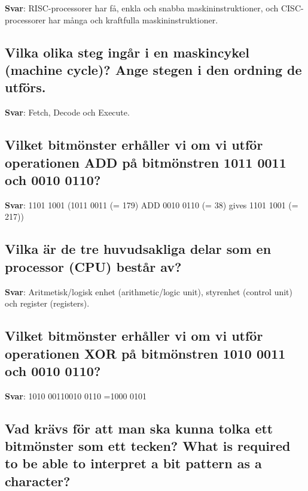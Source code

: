 \documentclass[a4paper,11pt,oneside]{article}
\begin{document}
\begin{sloppypar}
\label{q:97:sa:sv:True}

\textbf{Svar}: RISC-processorer har f\r{a}, enkla och snabba maskininstruktioner, och CISC-processorer har m\r{a}nga och kraftfulla maskininstruktioner.



\subsection{Vilka olika steg ing\r{a}r i en maskincykel (machine cycle)? Ange stegen i den ordning de utf\"ors.}

\label{q:98:sa:sv:True}

\textbf{Svar}: Fetch, Decode och Execute.



\subsection{Vilket bitm\"onster erh\r{a}ller vi om vi utf\"or operationen ADD p\r{a} bitm\"onstren 1011 0011 och 0010 0110?}

\label{q:99:sa:sv:True}

\textbf{Svar}: 1101 1001 (1011 0011 (= 179) ADD 0010 0110 (= 38) gives 1101 1001 (= 217))



\subsection{Vilka \"ar de tre huvudsakliga delar som en processor (CPU) best\r{a}r av?}

\label{q:100:sa:sv:True}

\textbf{Svar}: Aritmetisk/logisk enhet (arithmetic/logic unit), styrenhet (control unit) och register (registers).



\subsection{Vilket bitm\"onster erh\r{a}ller vi om vi utf\"or operationen XOR p\r{a} bitm\"onstren 1010 0011 och 0010 0110?}

\label{q:101:sa:sv:True}

\textbf{Svar}: 1010 00110010 0110 =1000 0101



\subsection{Vad kr\"avs f\"or att man ska kunna tolka ett bitm\"onster som ett tecken? What is required to be able to interpret a bit pattern as a character?}


\end{sloppypar}
\end{document}
